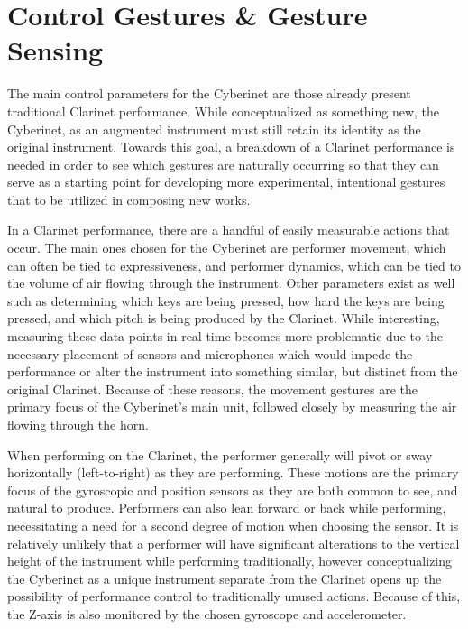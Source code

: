 \section{Control Gestures \& Gesture Sensing}
The main control parameters for the Cyberinet are those already present traditional Clarinet performance. While conceptualized as something new, the Cyberinet, as an augmented instrument must still retain its identity as the original instrument\cite{miranda_Wanderley_instrumentControl_2006}. Towards this goal, a breakdown of a Clarinet performance is needed in order to see which gestures are naturally occurring so that they can serve as a starting point for developing more experimental, intentional gestures that to be utilized in composing new works.

In a Clarinet performance, there are a handful of easily measurable actions that occur. The main ones chosen for the Cyberinet are performer movement, which can often be tied to expressiveness\cite{wanderleyClarinetGesture2005}, and performer dynamics, which can be tied to the volume of air flowing through the instrument. Other parameters exist as well such as determining which keys are being pressed, how hard the keys are being pressed, and which pitch is being produced by the Clarinet. While interesting, measuring these data points in real time becomes more problematic due to the necessary placement of sensors and microphones which would impede the performance or alter the instrument into something similar, but distinct from the original Clarinet. Because of these reasons, the movement gestures are the primary focus of the Cyberinet's main unit, followed closely by measuring the air flowing through the horn.

When performing on the Clarinet, the performer generally will pivot or sway horizontally (left-to-right) as they are performing. These motions are the primary focus of the gyroscopic and position sensors as they are both common to see, and natural to produce\cite{wanderleyClarinetGesture2005}. Performers can also lean forward or back while performing, necessitating a need for a second degree of motion when choosing the sensor. It is relatively unlikely that a performer will have significant alterations to the vertical height of the instrument while performing traditionally, however conceptualizing the Cyberinet as a unique instrument separate from the Clarinet opens up the possibility of performance control to traditionally unused actions. Because of this, the Z-axis is also monitored by the chosen gyroscope and accelerometer. 

